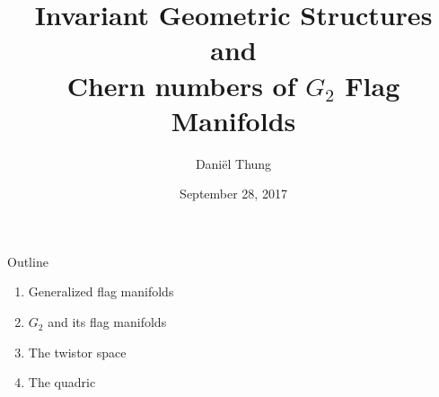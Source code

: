 \documentclass[11pt,parskip]{beamer}
\title[]{Invariant Geometric Structures and \\ Chern numbers of  $G_2$ Flag Manifolds}
\author[]{Dani\"el Thung\\[0.5cm]}
\institute[]{{\small LMU M\"unchen}\\[0.25cm]}
\date{{\footnotesize September 28, 2017}}
\begin{document}
\begin{frame}[plain]
\maketitle
\end{frame}

\begin{frame}{Outline}
	\begin{enumerate}
		\item Generalized flag manifolds
		\bigskip
		\item $G_2$ and its flag manifolds
		\bigskip
		\item The twistor space
		\bigskip
		\item The quadric
	\end{enumerate}
\end{frame}
\end{document}
